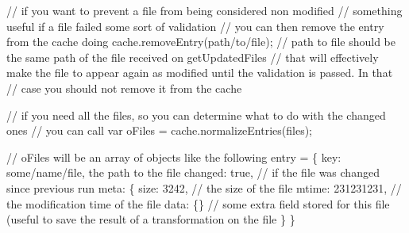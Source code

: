 // if you want to prevent a file from being considered non modified // something useful if a file failed some sort of validation // you can then remove the entry from the cache doing cache.\+remove\+Entry(\textquotesingle{}path/to/file\textquotesingle{}); // path to file should be the same path of the file received on {\ttfamily get\+Updated\+Files} // that will effectively make the file to appear again as modified until the validation is passed. In that // case you should not remove it from the cache

// if you need all the files, so you can determine what to do with the changed ones // you can call var o\+Files = cache.\+normalize\+Entries(files);

// o\+Files will be an array of objects like the following entry = \{ key\+: \textquotesingle{}some/name/file\textquotesingle{}, the path to the file changed\+: true, // if the file was changed since previous run meta\+: \{ size\+: 3242, // the size of the file mtime\+: 231231231, // the modification time of the file data\+: \{\} // some extra field stored for this file (useful to save the result of a transformation on the file \} \}


